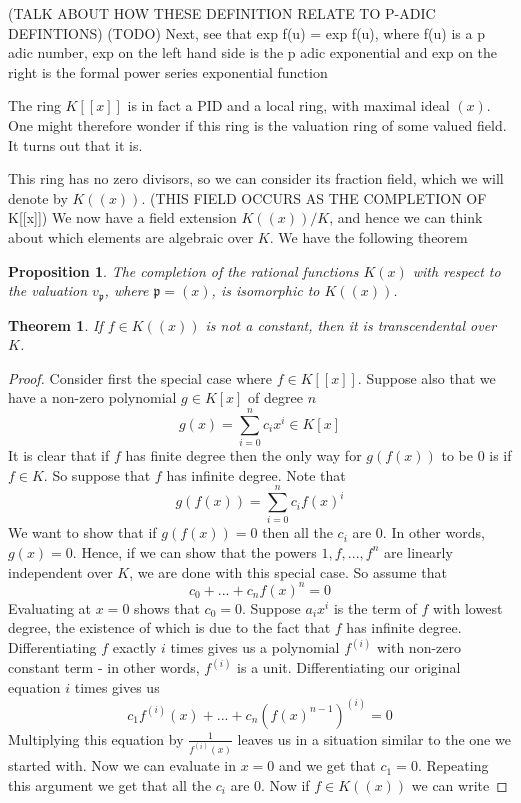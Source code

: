 \documentclass{article}
\newtheorem{theorem}{Theorem}[section]
\newtheorem{proposition}{Proposition}[section]
\newcommand{\mfrak}[1]{\mathfrak{#1}}
\begin{document}
(TALK ABOUT HOW THESE DEFINITION RELATE TO P-ADIC DEFINTIONS)
(TODO)
Next, see that exp f(u) = exp f(u), where f(u) is a p adic number, exp on the left hand side is the p adic exponential and exp on the right is the formal power series exponential function 



The ring $K[[x]]$ is in fact a PID and a local ring, with maximal ideal $(x)$. One might therefore wonder if this ring is the valuation ring of some valued field. It turns out that it is. 

This ring has no zero divisors, so we can consider its fraction field, which we will denote by $K((x))$. (THIS FIELD OCCURS AS THE COMPLETION OF K[[x]]) We now have a field extension $K((x)) / K$, and hence we can think about which elements are algebraic over $K$. We have the following theorem


\begin{proposition}
    The completion of the rational functions $K(x)$ with respect to the valuation $v_\mfrak{p}$, where $\mfrak p = (x)$, is isomorphic to $K((x))$.  
\end{proposition}

\begin{theorem}
    If $f \in K((x))$ is not a constant, then it is transcendental over $K$.  
\end{theorem}

\begin{proof}
    


    Consider first the special case where $f \in K[[x]]$. Suppose also that we have a non-zero polynomial $g \in K[x]$ of degree $n$
    $$g(x) = \sum_{i = 0}^n c_i x^i \in K[x]$$
    It is clear that if $f$ has finite degree then the only way for $g(f(x))$ to be 0 is if $f \in K$. So suppose that $f$ has infinite degree. Note that
    $$g(f(x)) = \sum_{i = 0}^n c_i f(x)^i$$
    We want to show that if $g(f(x)) = 0$ then all the $c_i$ are 0. In other words, $g(x) = 0$. Hence, if we can show that the powers $1, f, ..., f^{n}$ are linearly independent over $K$, we are done with this special case. So assume that 
    $$c_0  + ... + c_n f(x)^n = 0$$
    Evaluating at $x = 0$ shows that $c_0 = 0$. Suppose $a_i x^i$ is the term of $f$ with lowest degree, the existence of which is due to the fact that $f$ has infinite degree. Differentiating $f$ exactly $i$ times gives us a polynomial $f^{(i)}$ with non-zero constant term - in other words, $f^{(i)}$ is a unit. Differentiating our original equation $i$ times gives us 
    $$c_1 f^{(i)}(x) + ... + c_n (f(x)^{n-1})^{(i)} = 0$$
    Multiplying this equation by $\frac{1}{f^{(i)}(x)}$ leaves us in a situation similar to the one we started with. Now we can evaluate in $x = 0$ and we get that $c_1 = 0$. Repeating this argument we get that all the $c_i$ are 0. Now if $f \in K((x))$ we can write 
\end{proof}
\end{document}
